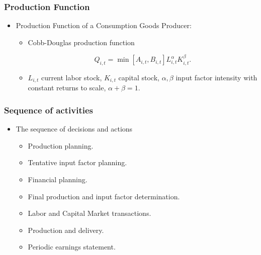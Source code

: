 \documentclass{beamer}
\begin{document}




\frame
{
  \frametitle{Production Function} 
\begin{itemize}
	\item Production Function of a Consumption Goods Producer:
	
	
\begin{itemize}
	
	\item Cobb-Douglas production function
	
	\[ Q_{i,t}=  \min \left[A_{i,t},B_{i,t}\right] L_{i,t}^{\alpha}K_{i,t}^{\beta}.\]
	
	\item $ L_{i,t}$ current labor stock, $ K_{i,t}$ capital stock, $\alpha, \beta$ input factor intensity with constant returns to scale, $\alpha + \beta =1$.

\end{itemize}

	\end{itemize}


}


\frame
{
  \frametitle{Sequence of activities} 


\begin{itemize}
	\item The sequence of decisions and actions
	\begin{itemize}
	\item Production planning.
	\item Tentative input factor planning.
	\item Financial planning.
	\item Final production and input factor determination.
	\item Labor and Capital Market transactions.
	\item Production and delivery.
	\item Periodic earnings statement.
	 
	\end{itemize}
	
	\end{itemize}


}
\end{document}
